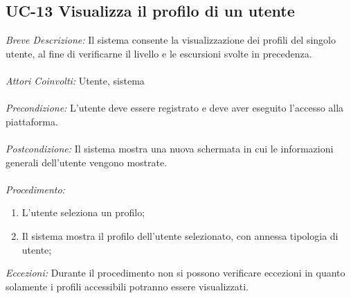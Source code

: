 \subsection{UC-13 Visualizza il profilo di un utente}
\label{sect:uc13}
\textit{Breve Descrizione:} Il sistema consente la visualizzazione dei profili del singolo utente, al fine di verificarne il livello
 e le escursioni svolte in precedenza.
\\
\\
\textit{Attori Coinvolti:} Utente, sistema
\\ 
\\
\textit{Precondizione:} L'utente deve essere registrato e deve aver eseguito l'accesso alla piattaforma.
\\
\\
\textit{Postcondizione:} Il sistema mostra una nuova schermata in cui le informazioni generali dell'utente vengono mostrate.
\\ 
\\
\textit{Procedimento:}
\begin{enumerate}
	\item L'utente seleziona un profilo;
	\item Il sistema mostra il profilo dell'utente selezionato, con annessa tipologia di utente;
\end{enumerate}

\textit{Eccezioni:} Durante il procedimento non si possono verificare eccezioni in quanto solamente i profili accessibili potranno essere visualizzati.
\\